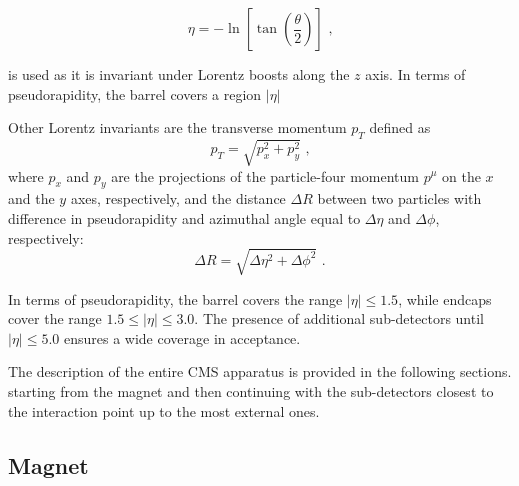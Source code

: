 \begin{equation}
\eta=-\ln\left [\tan\left(\frac{\theta}{2}\right)\right]\mbox{ ,}
\end{equation}

is used as it is invariant under Lorentz boosts along the $z$ axis.
In terms of pseudorapidity, the barrel covers a region $|\eta|$

Other Lorentz invariants are the transverse momentum $p_T$ defined as
\begin{equation}
p_T=\sqrt{p^2_x+p^2_y}\mbox{ ,}
\end{equation}
where $p_x$ and $p_y$ are the projections of the particle-four momentum $p^\mu$%
on the $x$ and the $y$ axes, respectively, and the distance $\Delta R$ between two particles with difference in 
pseudorapidity and azimuthal angle equal to $\Delta\eta$ and $\Delta\phi$, respectively:
\begin{equation}
\Delta R=\sqrt{ \Delta\eta^2 + \Delta\phi^2 }\mbox{ .}
\end{equation}

In terms of pseudorapidity, the barrel covers the range $|\eta|\le1.5$, 
while endcaps cover the range $1.5\le|\eta|\le3.0$. The presence of
additional sub-detectors until $|\eta|\le5.0$ ensures a wide coverage in acceptance.  

The description of the entire CMS apparatus is provided in the following sections.
starting from the magnet and then continuing with the sub-detectors closest to the
 interaction point up to the most external ones.
 
\subsection{Magnet}
\label{subsec:magnet}

